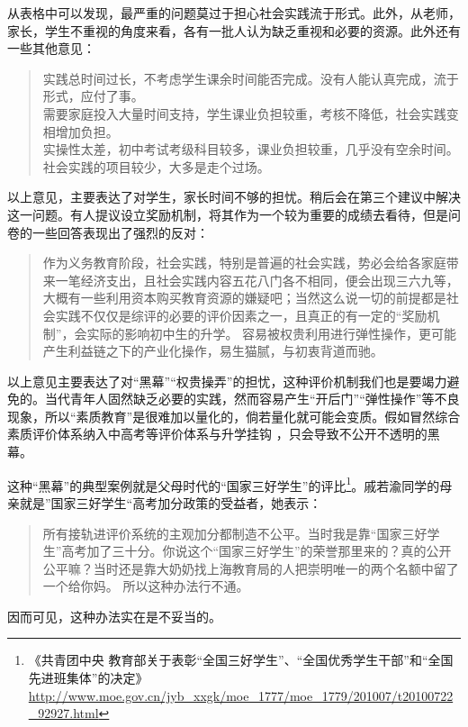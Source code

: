 \documentclass[12pt,UTF8]{ctexart}
\begin{document}
\par {
	从表格中可以发现，最严重的问题莫过于担心社会实践流于形式。此外，从老师，家长，学生不重视的角度来看，各有一批人认为缺乏重视和必要的资源。此外还有一些其他意见：
	\begin{quote}
		\kaishu 实践总时间过长，不考虑学生课余时间能否完成。没有人能认真完成，流于形式，应付了事。\\
		需要家庭投入大量时间支持，学生课业负担较重，考核不降低，社会实践变相增加负担。\\
		实操性太差，初中考试考级科目较多，课业负担较重，几乎没有空余时间。社会实践的项目较少，大多是走个过场。\\
	\end{quote}
	
	以上意见，主要表达了对学生，家长时间不够的担忧。稍后会在第三个建议中解决这一问题。有人提议设立奖励机制，将其作为一个较为重要的成绩去看待，但是问卷的一些回答表现出了强烈的反对：
	\begin{quote}
		\kaishu
		作为义务教育阶段，社会实践，特别是普遍的社会实践，势必会给各家庭带来一笔经济支出，且社会实践内容五花八门各不相同，便会出现三六九等，大概有一些利用资本购买教育资源的嫌疑吧；当然这么说一切的前提都是社会实践不仅仅是综评的必要的评价因素之一，且真正的有一定的“奖励机制”，会实际的影响初中生的升学。
		\kaishu 容易被权贵利用进行弹性操作，更可能产生利益链之下的产业化操作，易生猫腻，与初衷背道而驰。
	\end{quote}
	
	以上意见主要表达了对“黑幕”“权贵操弄”的担忧，这种评价机制我们也是要竭力避免的。当代青年人固然缺乏必要的实践，然而容易产生“开后门”“弹性操作”等不良现象，所以“素质教育”是很难加以量化的，倘若量化就可能会变质。假如冒然综合素质评价体系纳入中高考等评价体系与升学挂钩
	，只会导致不公开不透明的黑幕。
}
\par {
	这种“黑幕”的典型案例就是父母时代的“国家三好学生”的评比\footnote{《共青团中央
		教育部关于表彰“全国三好学生”、“全国优秀学生干部”和“全国先进班集体”的决定》\url{http://www.moe.gov.cn/jyb_xxgk/moe_1777/moe_1779/201007/t20100722_92927.html}}。戚若渝同学的母亲就是”国家三好学生“高考加分政策的受益者，她表示：
	\begin{quote}
		\kaishu
		所有接轨进评价系统的主观加分都制造不公平。当时我是靠“国家三好学生”高考加了三十分。你说这个“国家三好学生”的荣誉那里来的？真的公开公平嘛？当时还是靠大奶奶找上海教育局的人把崇明唯一的两个名额中留了一个给你妈。
		所以这种办法行不通。
	\end{quote}
	因而可见，这种办法实在是不妥当的。
}
\end{document}
